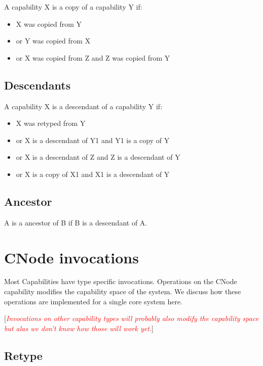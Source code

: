 \documentclass[a4paper,twoside]{report} %
\newcommand{\note}[1]{[\textcolor{red}{\textit{#1}}]}
\begin{document}
A capability X is a copy of a capability Y if:

\begin{itemize}
\item X was copied from Y
\item or Y was copied from X
\item or X was copied from Z and Z was copied from Y
\end{itemize}

\subsection{Descendants}

A capability X is a descendant of a capability Y if:

\begin{itemize}
\item X was retyped from Y

\item or X is a descendant of Y1 and Y1 is a copy of Y

\item or X is a descendant of Z and Z is a descendant of Y

\item or X is a copy of X1 and X1 is a descendant of Y
\end{itemize}

\subsection{Ancestor}

A is a ancestor of B if B is a descendant of A.

\section{CNode invocations}

Most Capabilities have type specific invocations.  Operations on the
CNode capability modifies the capability space of the system. We
discuss how these operations are implemented for a single core system
here.

\note{Invocations on other capability types will probably also modify
  the capability space but alas we don't know how those will work yet.}

\subsection{Retype}
\end{document}
